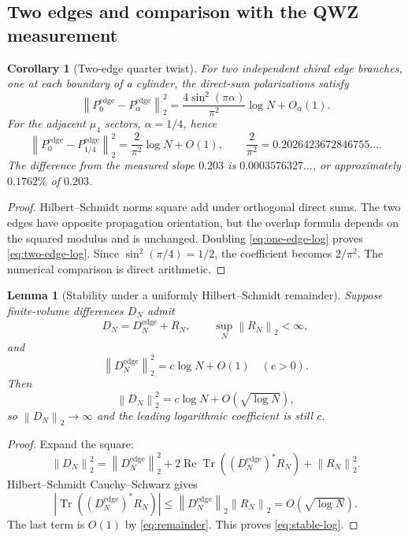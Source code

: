 \documentclass[11pt]{article}
\newtheorem{lemma}[theorem]{Lemma}
\newtheorem{corollary}[theorem]{Corollary}
\theoremstyle{remark}
\newcommand{\Tr}{\operatorname{Tr}}
\newcommand{\norm}[1]{\left\lVert #1\right\rVert}
\begin{document}
\subsection{Two edges and comparison with the QWZ measurement}

\begin{corollary}[Two-edge quarter twist]\label{cor:twoedge}
For two independent chiral edge branches, one at each boundary of a
cylinder, the direct-sum polarizations satisfy
\[
 \norm{P_0^{\mathrm{edge}}-P_\alpha^{\mathrm{edge}}}_2^2
 =\frac{4\sin^2(\pi\alpha)}{\pi^2}\log N+O_\alpha(1).
\tag{5.9}\label{eq:two-edge-log}
\]
For the adjacent $\mu_4$ sectors, $\alpha=1/4$, hence
\[
 \norm{P_0^{\mathrm{edge}}-P_{1/4}^{\mathrm{edge}}}_2^2
 =\frac2{\pi^2}\log N+O(1),
\qquad
\frac2{\pi^2}=0.2026423672846755\ldots .
\tag{5.10}\label{eq:quarter-coefficient}
\]
The difference from the measured slope $0.203$ is
$0.0003576327\ldots$, or approximately $0.1762\%$ of $0.203$.
\end{corollary}

\begin{proof}
Hilbert--Schmidt norms square add under orthogonal direct sums.  The two
edges have opposite propagation orientation, but the overlap formula
depends on the squared modulus and is unchanged.  Doubling
\eqref{eq:one-edge-log} proves \eqref{eq:two-edge-log}.  Since
$\sin^2(\pi/4)=1/2$, the coefficient becomes $2/\pi^2$.  The numerical
comparison is direct arithmetic.
\end{proof}

\begin{lemma}[Stability under a uniformly Hilbert--Schmidt remainder]
\label{lem:stability}
Suppose finite-volume differences $D_N$ admit
\[
 D_N=D_N^{\mathrm{edge}}+R_N,\qquad
 \sup_N\norm{R_N}_2<\infty,
\tag{5.11}\label{eq:remainder}
\]
and
\[
 \norm{D_N^{\mathrm{edge}}}_2^2=c\log N+O(1)
\quad(c>0).
\]
Then
\[
 \norm{D_N}_2^2=c\log N+O(\sqrt{\log N}),
\tag{5.12}\label{eq:stable-log}
\]
so $\norm{D_N}_2\to\infty$ and the leading logarithmic coefficient is
still $c$.
\end{lemma}

\begin{proof}
Expand the square:
\[
 \norm{D_N}_2^2
 =\norm{D_N^{\mathrm{edge}}}_2^2
 +2\operatorname{Re}\Tr((D_N^{\mathrm{edge}})^*R_N)
 +\norm{R_N}_2^2.
\]
Hilbert--Schmidt Cauchy--Schwarz gives
\[
 \left|\Tr((D_N^{\mathrm{edge}})^*R_N)\right|
 \le\norm{D_N^{\mathrm{edge}}}_2\norm{R_N}_2
 =O(\sqrt{\log N}).
\]
The last term is $O(1)$ by \eqref{eq:remainder}.  This proves
\eqref{eq:stable-log}.
\end{proof}
\end{document}

